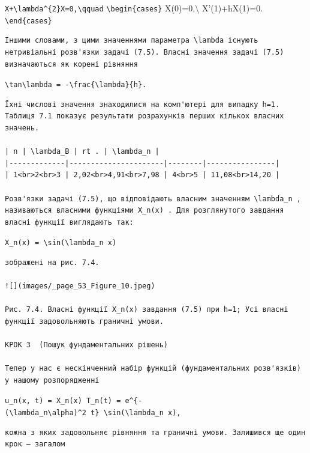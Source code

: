 \documentclass[
  ukrainian,
]{article}
\begin{document}
\texttt{X\textquotesingle{}\textquotesingle{}+\textbackslash{}lambda\^{}\{2\}X=0,\textbackslash{}qquad}
\texttt{\textbackslash{}begin\{cases\}} X(0)=0,\textbackslash{}
X'(1)+hX(1)=0. \texttt{\textbackslash{}end\{cases\}}

\begin{verbatim}
Іншими словами, з цими значеннями параметра \lambda існують нетривіальні розв'язки задачі (7.5). Власні значення задачі (7.5) визначаються як корені рівняння
\end{verbatim}

\texttt{\textbackslash{}tan\textbackslash{}lambda\ =\ -\textbackslash{}frac\{\textbackslash{}lambda\}\{h\}.}

\begin{verbatim}
Їхні числові значення знаходилися на комп'ютері для випадку h=1. Таблиця 7.1 показує результати розрахунків перших кількох власних значень.

| n | \lambda_B | rt . | \lambda_n |
|-------------|----------------------|--------|----------------|
| 1<br>2<br>3 | 2,02<br>4,91<br>7,98 | 4<br>5 | 11,08<br>14,20 |

Розв'язки задачі (7.5), що відповідають власним значенням \lambda_n , називаються власними функціями X_n(x) . Для розглянутого завдання власні функції виглядають так:
\end{verbatim}

\texttt{X\_n(x)\ =\ \textbackslash{}sin(\textbackslash{}lambda\_n\ x)}

\begin{verbatim}
зображені на рис. 7.4.

![](images/_page_53_Figure_10.jpeg)

Рис. 7.4. Власні функції X_n(x) завдання (7.5) при h=1; Усі власні функції задовольняють граничні умови.

КРОК 3  (Пошук фундаментальних рішень)

Тепер у нас є нескінченний набір функцій (фундаментальних розв'язків) у нашому розпорядженні
\end{verbatim}

\texttt{u\_n(x,\ t)\ =\ X\_n(x)\ T\_n(t)\ =\ e\^{}\{-(\textbackslash{}lambda\_n\textbackslash{}alpha)\^{}2\ t\}\ \textbackslash{}sin(\textbackslash{}lambda\_n\ x),}

\begin{verbatim}
кожна з яких задовольняє рівняння та граничні умови. Залишився ще один крок — загалом
\end{verbatim}
\end{document}
